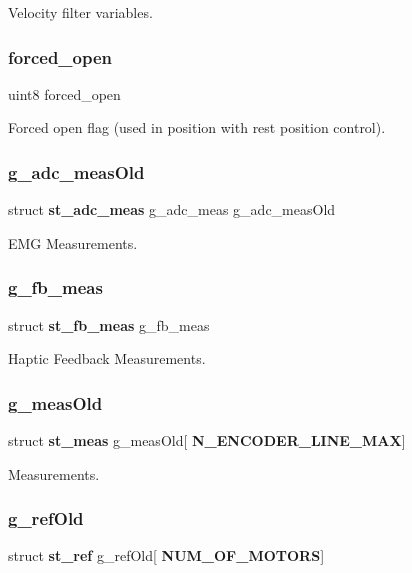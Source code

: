 Velocity filter variables. \mbox{\label{globals_8c_a0f13b80a0c329fa3176eb1e72ef36fb8}} 
\subsubsection{forced\+\_\+open}
{\footnotesize\ttfamily uint8 forced\+\_\+open}

Forced open flag (used in position with rest position control). \mbox{\label{globals_8c_acc5bb8855e965e00106ae614ae1aa510}} 
\subsubsection{g\+\_\+adc\+\_\+meas\+Old}
{\footnotesize\ttfamily struct \textbf{ st\+\_\+adc\+\_\+meas} g\+\_\+adc\+\_\+meas g\+\_\+adc\+\_\+meas\+Old}

E\+MG Measurements. \mbox{\label{globals_8c_af8d2d84570b7e85614e0455a23177e62}} 
\subsubsection{g\+\_\+fb\+\_\+meas}
{\footnotesize\ttfamily struct \textbf{ st\+\_\+fb\+\_\+meas} g\+\_\+fb\+\_\+meas}

Haptic Feedback Measurements. \mbox{\label{globals_8c_a7b175385b2b9418fa7159c72d0f470fd}} 
\subsubsection{g\+\_\+meas\+Old}
{\footnotesize\ttfamily struct \textbf{ st\+\_\+meas} g\+\_\+meas\+Old[\textbf{ N\+\_\+\+E\+N\+C\+O\+D\+E\+R\+\_\+\+L\+I\+N\+E\+\_\+\+M\+AX}]}

Measurements. \mbox{\label{globals_8c_aab927f8d9bc1a835daed821aa97b9335}} 
\subsubsection{g\+\_\+ref\+Old}
{\footnotesize\ttfamily struct \textbf{ st\+\_\+ref} g\+\_\+ref\+Old[\textbf{ N\+U\+M\+\_\+\+O\+F\+\_\+\+M\+O\+T\+O\+RS}]}

